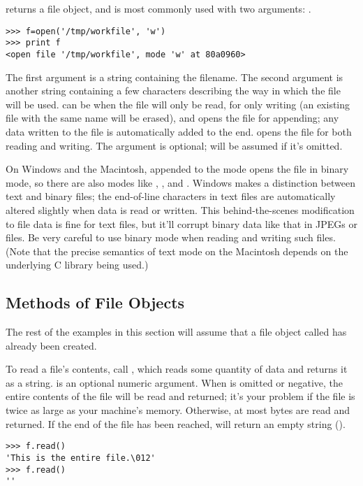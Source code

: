 \documentclass{manual}
\begin{document}
 returns a file
object, and is most commonly used with two arguments:
.

\begin{verbatim}
>>> f=open('/tmp/workfile', 'w')
>>> print f
<open file '/tmp/workfile', mode 'w' at 80a0960>
\end{verbatim}

The first argument is a string containing the filename.  The second
argument is another string containing a few characters describing the
way in which the file will be used.   can be  when
the file will only be read,  for only writing (an existing
file with the same name will be erased), and  opens the file
for appending; any data written to the file is automatically added to
the end.   opens the file for both reading and writing.
The  argument is optional;  will be assumed if
it's omitted.

On Windows and the Macintosh,  appended to the
mode opens the file in binary mode, so there are also modes like
, , and .  Windows makes a
distinction between text and binary files; the end-of-line characters
in text files are automatically altered slightly when data is read or
written.  This behind-the-scenes modification to file data is fine for
\ASCII{} text files, but it'll corrupt binary data like that in JPEGs or
 files.  Be very careful to use binary mode when reading and
writing such files.  (Note that the precise semantics of text mode on
the Macintosh depends on the underlying C library being used.)

\subsection{Methods of File Objects \label{fileMethods}}

The rest of the examples in this section will assume that a file
object called  has already been created.

To read a file's contents, call , which reads
some quantity of data and returns it as a string.   is an
optional numeric argument.  When  is omitted or negative,
the entire contents of the file will be read and returned; it's your
problem if the file is twice as large as your machine's memory.
Otherwise, at most  bytes are read and returned.  If the end
of the file has been reached,  will return an empty
string ().
\begin{verbatim}
>>> f.read()
'This is the entire file.\012'
>>> f.read()
''
\end{verbatim}
\end{document}
